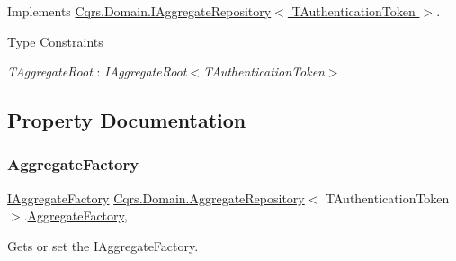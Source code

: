 Implements \hyperlink{interfaceCqrs_1_1Domain_1_1IAggregateRepository_a306baf8aa6faabe893f93e5db5d3517d_a306baf8aa6faabe893f93e5db5d3517d}{Cqrs.\+Domain.\+I\+Aggregate\+Repository$<$ T\+Authentication\+Token $>$}.

\begin{Desc}
\item[Type Constraints]\begin{description}
\item[{\em T\+Aggregate\+Root} : {\em I\+Aggregate\+Root$<$T\+Authentication\+Token$>$}]\end{description}
\end{Desc}


\subsection{Property Documentation}
\mbox{\label{classCqrs_1_1Domain_1_1AggregateRepository_a9c2ffdf87ba242cf0c540f4b0d020777_a9c2ffdf87ba242cf0c540f4b0d020777}} 
\subsubsection{\texorpdfstring{Aggregate\+Factory}{AggregateFactory}}
{\footnotesize\ttfamily \hyperlink{interfaceCqrs_1_1Domain_1_1Factories_1_1IAggregateFactory}{I\+Aggregate\+Factory} \hyperlink{classCqrs_1_1Domain_1_1AggregateRepository}{Cqrs.\+Domain.\+Aggregate\+Repository}$<$ T\+Authentication\+Token $>$.\hyperlink{classCqrs_1_1Domain_1_1Factories_1_1AggregateFactory}{Aggregate\+Factory}\hspace{0.3cm}{\ttfamily [get]}, {\ttfamily [protected]}}



Gets or set the I\+Aggregate\+Factory. 

\mbox{\label{classCqrs_1_1Domain_1_1AggregateRepository_a758d2fd5c0cf30bc038a996800421fd0_a758d2fd5c0cf30bc038a996800421fd0}} 
